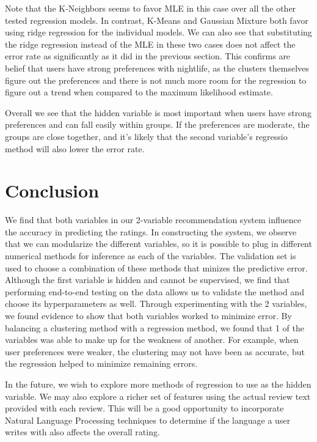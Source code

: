 \documentclass[11pt]{article}
\begin{document}
Note that the K-Neighbors seems to favor MLE in this case over all the other tested regression models. In contrast, K-Means and Gaussian Mixture both favor using ridge regression for the individual models. We can also see that substituting the ridge regression instead of the MLE in these two cases does not affect the error rate as significantly as it did in the previous section. This confirms are belief that users have strong preferences with nightlife, as the clusters themselves figure out the preferences and there is not much more room for the regression to figure out a trend when compared to the maximum likelihood estimate.

Overall we see that the hidden variable is most important when users have strong preferences and can fall easily within groups. If the preferences are moderate, the groups are close together, and it's likely that the second variable's regressio method will also lower the error rate.

\section{Conclusion}
We find that both variables in our 2-variable recommendation system influence the accuracy in predicting the ratings. In constructing the system, we observe that we can modularize the different variables, so it is possible to plug in different numerical methods for inference as each of the variables. The validation set is used to choose a combination of these methods that minizes the predictive error. Although the first variable is hidden and cannot be supervised, we find that performing end-to-end testing on the data allows us to validate the method and choose its hyperparameters as well. Through experimenting with the 2 variables, we found evidence to show that both variables worked to minimize error. By balancing a clustering method with a regression method, we found that 1 of the variables was able to make up for the weakness of another. For example, when user preferences were weaker, the clustering may not have been as accurate, but the regression helped to minimize remaining errors.

In the future, we wish to explore more methods of regression to use as the hidden variable. We may also explore a richer set of features using the actual review text provided with each review. This will be a good opportunity to incorporate Natural Language Processing techniques to determine if the language a user writes with also affects the overall rating.

\clearpage

\end{document}

